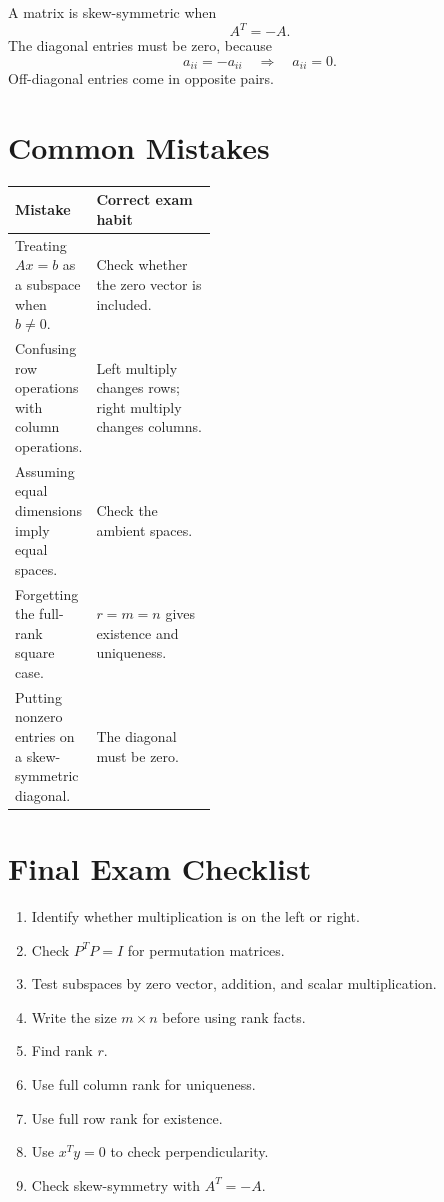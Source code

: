 \documentclass[10pt]{article}
\begin{document}
A matrix is skew-symmetric when
\[
A^{T}=-A.
\]
The diagonal entries must be zero, because
\[
a_{ii}=-a_{ii}
\quad\Rightarrow\quad
a_{ii}=0.
\]
Off-diagonal entries come in opposite pairs.

\section{Common Mistakes}

\begin{center}
\small
\begin{tabularx}{\linewidth}{@{}L{0.40\linewidth}Y@{}}
\toprule
Mistake & Correct exam habit \\
\midrule
Treating \(Ax=b\) as a subspace when \(b\ne0\). & Check whether the zero vector is included. \\
Confusing row operations with column operations. & Left multiply changes rows; right multiply changes columns. \\
Assuming equal dimensions imply equal spaces. & Check the ambient spaces. \\
Forgetting the full-rank square case. & \(r=m=n\) gives existence and uniqueness. \\
Putting nonzero entries on a skew-symmetric diagonal. & The diagonal must be zero. \\
\bottomrule
\end{tabularx}
\end{center}

\section{Final Exam Checklist}

\begin{enumerate}
  \item Identify whether multiplication is on the left or right.
  \item Check \(P^{T}P=I\) for permutation matrices.
  \item Test subspaces by zero vector, addition, and scalar multiplication.
  \item Write the size \(m\times n\) before using rank facts.
  \item Find rank \(r\).
  \item Use full column rank for uniqueness.
  \item Use full row rank for existence.
  \item Use \(x^{T}y=0\) to check perpendicularity.
  \item Check skew-symmetry with \(A^{T}=-A\).
\end{enumerate}
\end{document}
